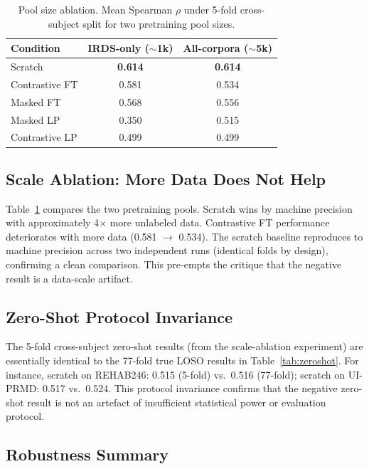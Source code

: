 \documentclass[10pt,journal]{IEEEtran}
\begin{document}
\begin{table}[t]
\centering
\caption{Pool size ablation. Mean Spearman $\rho$ under 5-fold cross-subject split for two pretraining pool sizes.}
\label{tab:pool}
\begin{tabular}{lcc}
\toprule
Condition & IRDS-only ($\sim$1k) & All-corpora ($\sim$5k) \\
\midrule
Scratch         & \textbf{0.614} & \textbf{0.614} \\
Contrastive FT  & 0.581          & 0.534 \\
Masked FT       & 0.568          & 0.556 \\
Masked LP       & 0.350          & 0.515 \\
Contrastive LP  & 0.499          & 0.499 \\
\bottomrule
\end{tabular}
\end{table}

\subsection{Scale Ablation: More Data Does Not Help}
\label{sec:scale}

Table~\ref{tab:pool} compares the two pretraining pools. Scratch wins by machine precision with approximately 4$\times$ more unlabeled data. Contrastive FT performance deteriorates with more data (0.581 $\to$ 0.534). The scratch baseline reproduces to machine precision across two independent runs (identical folds by design), confirming a clean comparison. This pre-empts the critique that the negative result is a data-scale artifact.

\subsection{Zero-Shot Protocol Invariance}
\label{sec:protocol-invariance}

The 5-fold cross-subject zero-shot results (from the scale-ablation experiment) are essentially identical to the 77-fold true LOSO results in Table~\ref{tab:zeroshot}. For instance, scratch on REHAB246: 0.515 (5-fold) vs.\ 0.516 (77-fold); scratch on UI-PRMD: 0.517 vs.\ 0.524. This protocol invariance confirms that the negative zero-shot result is not an artefact of insufficient statistical power or evaluation protocol.

\subsection{Robustness Summary}
\label{sec:robustness}
\end{document}
